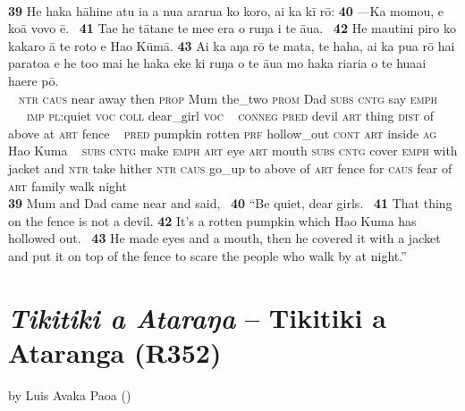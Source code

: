 ~

\bigskip\gll
\textbf{\textup{39}} He haka hāhine atu ia a nua ararua ko koro, {\ꞌ}ai ka kī rō: \textbf{\textup{40}} —Ka momou, e koā vovo ē. ~\textbf{\textup{41}} Ta{\ꞌ}e he tātane te me{\ꞌ}e era o ruŋa i te {\ꞌ}āua. ~\textbf{\textup{42}} He mautini piro ko kakaro {\ꞌ}ā te roto e Hao Kūmā. \textbf{\textup{43}} {\ꞌ}Ai ka aŋa rō te mata, te haha, {\ꞌ}ai ka pu{\ꞌ}a rō hai paratoa {\ꞌ}e he to{\ꞌ}o mai he haka eke ki ruŋa o te {\ꞌ}āua mo haka ri{\ꞌ}ari{\ꞌ}a o te hua{\ꞌ}ai ha{\ꞌ}ere pō.\\
~ \textsc{ntr} \textsc{caus} near away then \textsc{prop} Mum the\_two \textsc{prom} Dad \textsc{subs} \textsc{cntg} say \textsc{emph} ~ ~~~\textsc{imp} \textsc{pl}:quiet \textsc{voc} \textsc{coll} dear\_girl \textsc{voc} ~ \textsc{conneg} \textsc{pred} devil \textsc{art} thing \textsc{dist} of above at \textsc{art} fence ~ \textsc{pred} pumpkin rotten \textsc{prf} hollow\_out \textsc{cont} \textsc{art} inside \textsc{ag} Hao Kuma ~ \textsc{subs} \textsc{cntg} make \textsc{emph} \textsc{art} eye \textsc{art} mouth \textsc{subs} \textsc{cntg} cover \textsc{emph} with jacket and \textsc{ntr} take hither \textsc{ntr} \textsc{caus} go\_up to above of \textsc{art} fence for \textsc{caus} fear of \textsc{art} family walk night\\

\medskip\glt
\textbf{\textup{39}} Mum and Dad came near and said, ~\textbf{\textup{40}} “Be quiet, dear girls. ~\textbf{\textup{41}} That thing on the fence is not a devil. \textbf{\textup{42}} It’s a rotten pumpkin which Hao Kuma has hollowed out. ~\textbf{\textup{43}} He made eyes and a mouth, then he covered it with a jacket and put it on top of the fence to scare the people who walk by at night.”

\newpage
\section*{\textit{Tikitiki {\ꞌ}a {\ꞌ}Ataraŋa} – Tikitiki a Ataranga (R352)}\label{sec:a.2}

by Luis Avaka Paoa (\citealt[Vol. 4:93–98]{WeberWeber1990Mai})

~

